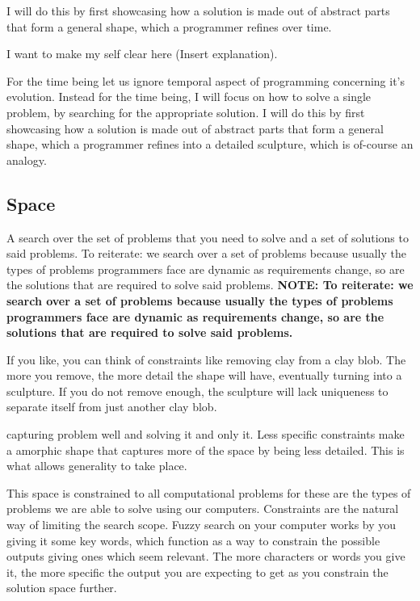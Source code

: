 \documentclass[a4paper]{article}
\begin{document}
I will do this by first showcasing how a solution is made out of abstract parts that form 
a general shape, which a programmer refines over time.

I want to make my self clear here (Insert explanation).  

For the time being let us ignore temporal aspect of programming concerning it's evolution.
Instead for the time being, I will focus on how to solve a single problem, by searching for 
the appropriate solution. I will do this by first showcasing how a solution is made out 
of abstract parts that form a general shape, which a programmer refines into a detailed 
sculpture, which is of-course an analogy.



\subsection{Space}
A search over the set of problems that you need to solve and a set of solutions to said problems. 
To reiterate: we search over a set of problems because usually the types of problems programmers 
face are dynamic as requirements change, so are the solutions that are required to solve said problems.
\textbf{NOTE: To reiterate: we search over a set of problems because usually the types of problems programmers face are dynamic as requirements change, so are the solutions that are required to solve said problems.}

If you like, you can think of constraints like removing clay from a clay blob. The more 
you remove, the more detail the shape will have, eventually turning into a sculpture. If 
you do not remove enough, the sculpture will lack uniqueness to separate itself from just 
another clay blob.

capturing problem well and solving it and only it. Less specific 
constraints make a amorphic shape that captures more of the space by being less detailed.
This is what allows generality to take place.

This space is constrained to all computational problems for these are the types of problems we 
are able to solve using our computers. Constraints are the natural way of limiting the search 
scope. Fuzzy search on your computer works by you giving it some key words, which function as
a way to constrain the possible outputs giving ones which seem relevant. The more characters
or words you give it, the more specific the output you are expecting to get as you constrain
the solution space further.
\end{document}
